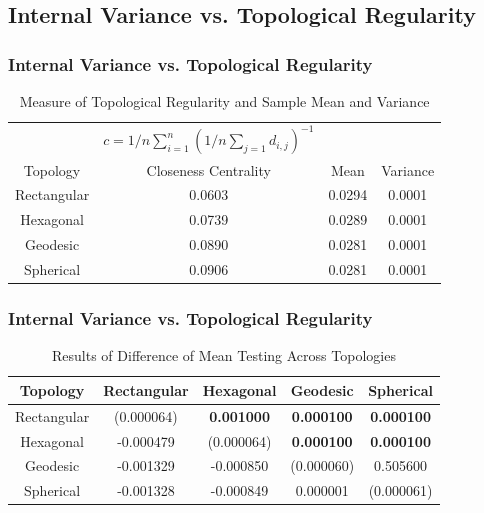 \documentclass[nototal,handout]{beamer}
\begin{document}
\subsection{Internal Variance vs. Topological Regularity} 

\begin{frame}
	\frametitle{Internal Variance vs. Topological Regularity}
  \begin{table}
  \centering
  \begin{minipage}{\textwidth}
  \caption{Measure of Topological Regularity and Sample Mean and Variance}
  \label{vardeg}
  \begin{tabular}{|c||c|c|c|}
  \hline
  &$c=1/n \sum_{i=1}^n (1/n \sum_{j=1} d_{i,j})^{-1}$&&\\
  Topology & Closeness Centrality & Mean & Variance\\
  \hline
  Rectangular & 0.0603 & 0.0294 &0.0001\\
  Hexagonal & 0.0739 & 0.0289 &0.0001\\
  Geodesic & 0.0890 & 0.0281 &0.0001\\
  Spherical & 0.0906 & 0.0281 &0.0001\\
  \hline
  \end{tabular}
  \end{minipage}
  \end{table}
 \end{frame} 

\begin{frame}
	\frametitle{Internal Variance vs. Topological Regularity}
  \begin{table}
    \begin{minipage}{\textwidth}
    \caption{Results of Difference of Mean Testing Across Topologies}
    \label{rlt:all}
    \begin{tabular}{|c||c|c|c|c|}
    \hline
    \textbf{Topology}&Rectangular		&Hexagonal &Geodesic &Spherical\\\hline
    \hline
 	Rectangular & (0.000064) & \textbf{0.001000} & \textbf{0.000100} & \textbf{0.000100}\\\hline
 	Hexagonal & -0.000479 & (0.000064) & \textbf{0.000100} & \textbf{0.000100}\\\hline
 	Geodesic & -0.001329 & -0.000850 & (0.000060) & 0.505600\\\hline
 	Spherical & -0.001328 & -0.000849 & 0.000001 & (0.000061)\\\hline
 
    \end{tabular}
    \end{minipage}
  \end{table}
 \end{frame} 
\end{document}
